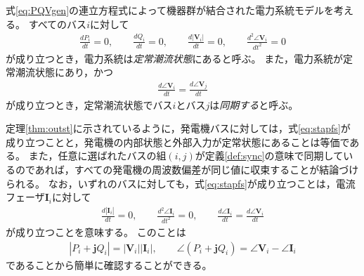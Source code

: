 \documentclass[tombow,dvipdfmx]{corona-a5}
\begin{document}
\begin{定義}[定常潮流状態とバス電圧の同期]
\label{def:sync}
式\ref{eq:PQVgen}の連立方程式によって機器群が結合された電力系統モデルを考える。
すべてのバス$i$に対して
\begin{align}\label{eq:stapfs}
\frac{dP_i}{dt}=0
,\qquad
\frac{dQ_i}{dt}=0
,\qquad
\frac{d|\bm{V}_i|}{dt}=0
,\qquad
\frac{d^2 \angle \bm{V}_i }{dt^2}=0
\end{align}
が成り立つとき，電力系統は\emph{定常潮流状態}にあると呼ぶ。
また，電力系統が定常潮流状態にあり，かつ
\begin{align}\label{eq:defsyn}
\frac{d \angle \bm{V}_i}{dt} =  \frac{d \angle \bm{V}_j}{dt}
\end{align}
が成り立つとき，定常潮流状態でバス$i$とバス$j$は\emph{同期する}と呼ぶ。
\end{定義}

定理\ref{thm:outst}に示されているように，発電機バスに対しては，式\ref{eq:stapfs}が成り立つことと，発電機の内部状態と外部入力が定常状態にあることは等価である。
また，任意に選ばれたバスの組$(i,j)$が定義\ref{def:sync}の意味で同期しているのであれば，すべての発電機の周波数偏差が同じ値に収束することが結論づけられる。
なお，いずれのバスに対しても，式\ref{eq:stapfs}が成り立つことは，電流フェーザ$\bm{I}_i$に対して
\begin{align*}
\frac{d|\bm{I}_i|}{dt}=0
,\qquad
\frac{d^2 \angle \bm{I}_i }{dt^2}=0
,\qquad
\frac{d \angle \bm{I}_i }{dt} = \frac{d \angle \bm{V}_i }{dt} 
\end{align*}
が成り立つことを意味する。
このことは
\begin{align*}
|P_i + \bm{j} Q_i| = |\bm{V}_i| |\bm{I}_i|
,\qquad
\angle(P_i + \bm{j} Q_i) = \angle \bm{V}_i - \angle \bm{I}_i
\end{align*}
であることから簡単に確認することができる。
\end{document}
